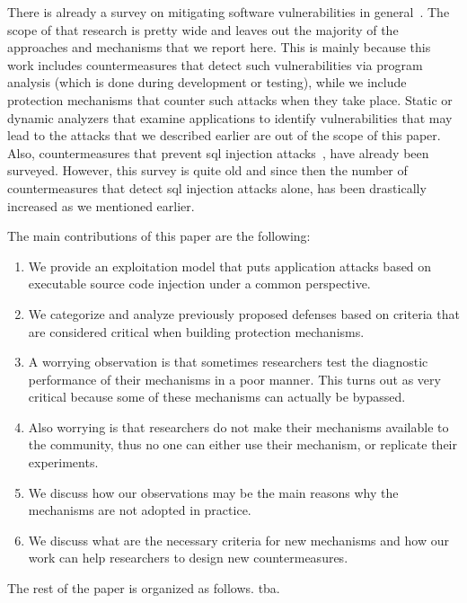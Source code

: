 \documentclass[conference]{IEEEtran}
\begin{document}
There is already a survey on mitigating software vulnerabilities
in general~\cite{SZ12}. The scope of that
research is pretty wide and leaves out the majority of the
approaches and mechanisms that we report here.
This is mainly because this work includes countermeasures
that detect such vulnerabilities via program analysis
(which is done during development or testing), while
we include protection mechanisms that counter
such attacks when they take place. Static or
dynamic analyzers that examine applications to
identify vulnerabilities that may lead to the attacks
that we described earlier are out of the scope of this paper.
Also, countermeasures that prevent {\sc sql}
injection attacks~\cite{HVO06}, have already been surveyed.
However, this survey is quite old and since then
the number of countermeasures that detect {\sc sql}
injection attacks alone, has been drastically increased
as we mentioned earlier.

The main contributions of this paper are the following:

\begin{enumerate}
\item We provide an exploitation model that puts application attacks
  based on executable source code injection under a common
  perspective.
\item We categorize and analyze previously proposed defenses based on
  criteria that are considered critical when building protection
  mechanisms.
\item A worrying observation is that sometimes researchers test the
  diagnostic performance of their mechanisms in a poor manner. This
  turns out as very critical because some of these mechanisms can
  actually be bypassed.
\item Also worrying is that researchers do not make their mechanisms
  available to the community, thus no one can either use their
  mechanism, or replicate their experiments.
\item We discuss how our observations may be the main reasons why the
  mechanisms are not adopted in practice.
\item We discuss what are the necessary criteria for new mechanisms
  and how our work can help researchers to design new countermeasures.
\end{enumerate}

The rest of the paper is organized as follows. {\sc tba}.

\end{document}
